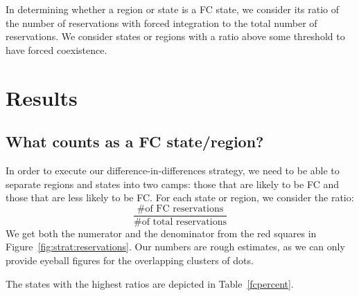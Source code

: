 \documentclass[12pt]{article}
\begin{document}
In determining whether a region or state is a FC state, we consider its ratio of the number of reservations with forced integration to the total number of reservations.
We consider states or regions with a ratio above some threshold to have forced coexistence.





\section{Results}

\subsection{What counts as a FC state/region?}
In order to execute our difference-in-differences strategy, we need to be able to separate regions and states into two camps: those that are likely to be FC and those that are less likely to be FC. For each state or region, we consider the ratio:
$$\frac{\mbox{\# of FC reservations}}{\mbox{\# of total reservations}}$$
We get both the numerator and the denominator from the red squares in Figure~\ref{fig:strat:reservations}. Our numbers are rough estimates, as we can only provide eyeball figures for the overlapping clusters of dots.

The states with the highest ratios are depicted in Table~\ref{fcpercent}.
\end{document}
